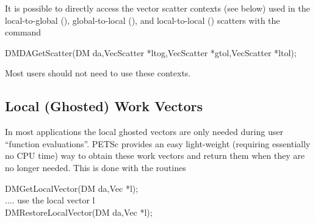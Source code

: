 It is possible to directly access the vector scatter contexts (see below)
used in the local-to-global (), global-to-local 
(), and local-to-local ()
scatters with the command
\begin{tabbing}
  DMDAGetScatter(DM da,VecScatter *ltog,VecScatter *gtol,VecScatter *ltol);
\end{tabbing}
Most users should not need to use these contexts.

\subsection{Local (Ghosted) Work Vectors}
In most applications the local ghosted vectors are only needed during user
``function evaluations''. PETSc provides an easy light-weight (requiring 
essentially no CPU time) way to obtain these work vectors and return them when
they are no longer needed. This is done with the routines
\begin{tabbing}
  DMGetLocalVector(DM da,Vec *l);\\
   .... use the local vector l\\
  DMRestoreLocalVector(DM da,Vec *l);
\end{tabbing}

